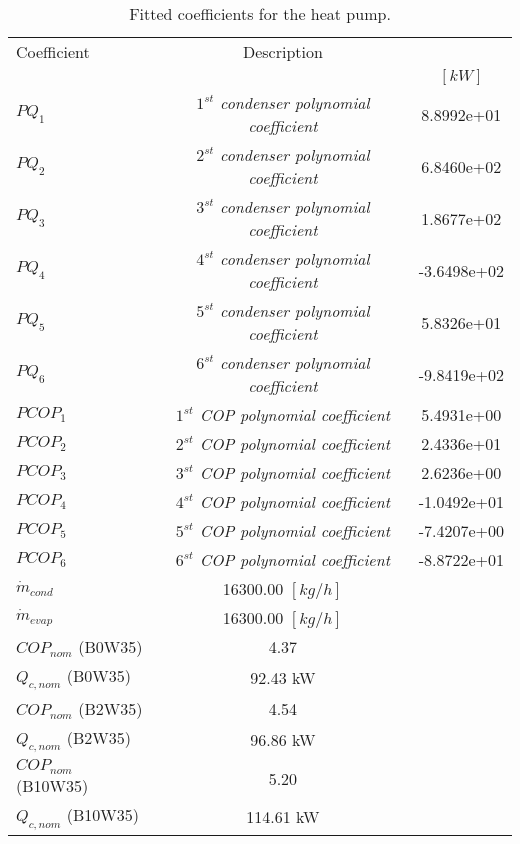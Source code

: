 \documentclass[english]{SPFShortReport}
\author{Dani Carbonell}
\begin{document}
\begin{table}[!ht]
\begin{small}
\caption{Fitted coefficients for the heat pump.}
\begin{center}
\resizebox{12cm}{!} 
{
\begin{tabular}{l | c c } 
\hline
\hline
Coefficient &Description & \\ 
 & &$[kW]$\\ 
\hline
$PQ_{1}$ & \emph{$1^{st}$ condenser polynomial coefficient}  & 8.8992e+01    \\ 
$PQ_{2}$ & \emph{$2^{st}$ condenser polynomial coefficient}  & 6.8460e+02    \\ 
$PQ_{3}$ & \emph{$3^{st}$ condenser polynomial coefficient}  & 1.8677e+02    \\ 
$PQ_{4}$ & \emph{$4^{st}$ condenser polynomial coefficient}  & -3.6498e+02    \\ 
$PQ_{5}$ & \emph{$5^{st}$ condenser polynomial coefficient}  & 5.8326e+01    \\ 
$PQ_{6}$ & \emph{$6^{st}$ condenser polynomial coefficient}  & -9.8419e+02    \\ 
\hline
$PCOP_{1}$ & \emph{$1^{st}$ COP polynomial coefficient}  & 5.4931e+00    \\ 
$PCOP_{2}$ & \emph{$2^{st}$ COP polynomial coefficient}  & 2.4336e+01    \\ 
$PCOP_{3}$ & \emph{$3^{st}$ COP polynomial coefficient}  & 2.6236e+00    \\ 
$PCOP_{4}$ & \emph{$4^{st}$ COP polynomial coefficient}  & -1.0492e+01    \\ 
$PCOP_{5}$ & \emph{$5^{st}$ COP polynomial coefficient}  & -7.4207e+00    \\ 
$PCOP_{6}$ & \emph{$6^{st}$ COP polynomial coefficient}  & -8.8722e+01    \\ 
\hline
$\dot m_{cond}$ & 16300.00 $[kg/h]$\\ 
$\dot m_{evap}$ & 16300.00 $[kg/h]$\\ 
\hline
$COP_{nom}$ (B0W35)& 4.37 \\ 
$Q_{c,nom}$ (B0W35)& 92.43 kW\\ 
$COP_{nom}$ (B2W35)& 4.54 \\ 
$Q_{c,nom}$ (B2W35)& 96.86 kW\\ 
$COP_{nom}$ (B10W35)& 5.20 \\ 
$Q_{c,nom}$ (B10W35)& 114.61 kW\\ 
\hline
\hline
\end{tabular}
}
\label{CoefTable}
\end{center}
\end{small}
\end{table}
\end{document}
